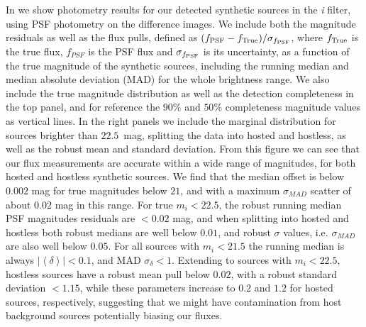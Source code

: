 %
In  we show photometry results for our detected synthetic sources in the \textit{i} filter, using \gls{PSF} photometry on the difference images.
We include both the magnitude residuals as well as the flux pulls, defined as $(f_{\rm{PSF}}-f_{\rm{True}})/\sigma_{f_{\rm{PSF}}}$, where $f_{\rm True}$ is the true flux, $f_{PSF}$ is the PSF flux and $\sigma_{f_{\rm{PSF}}}$ is its uncertainty, as a function of the true magnitude of the synthetic sources, including the running median and median absolute deviation (MAD) for the whole brightness range.
We also include the true magnitude distribution as well as the detection completeness in the top panel, and for reference the $90\%$ and $50\%$ completeness magnitude values as vertical lines.
In the right panels we include the marginal distribution for sources brighter than $22.5$~mag, splitting the data into hosted and hostless, as well as the robust mean and standard deviation.
%
From this figure we can see that our \gls{flux} measurements are accurate within a wide range of magnitudes, for both hosted and hostless synthetic sources.
We find that the median offset is below $0.002$ mag for true magnitudes below $21$, and with a maximum $\sigma_{MAD}$ scatter of about $0.02$ mag in this range.
For true $m_i < 22.5$, the robust running median PSF magnitudes residuals are $<0.02$ mag, and when splitting into hosted and hostless both robust medians are well below $0.01$, and robust $\sigma$ values, i.e. $\sigma_{MAD}$ are also well below $0.05$.
%
For all sources with $m_i<21.5$ the running median is always $|\left<\delta\right>| <0.1$, and MAD $\sigma_\delta < 1$.
Extending to sources with $m_i<22.5$,  hostless sources have  a robust mean pull below $0.02$, with a robust standard deviation $<1.15$, while these parameters increase to $0.2$ and $1.2$ for hosted sources, respectively,  suggesting that we might have contamination from host background sources potentially biasing our fluxes.
%
